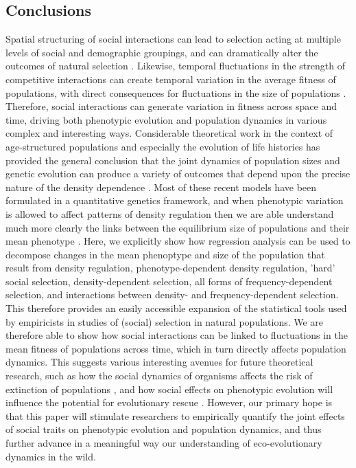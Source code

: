 \documentclass{article}
\begin{document}
\subsection{Conclusions}
Spatial structuring of social interactions can lead to selection acting at multiple levels of social and demographic groupings, and can dramatically alter the outcomes of natural selection \citep{Okasha2004, frank1998foundations, Wolf1999SocialSelection}. Likewise, temporal fluctuations in the strength of competitive interactions can create temporal variation in the average fitness of populations, with direct consequences for fluctuations in the size of populations \citep{Gilpin1973a}. Therefore, social interactions can generate variation in fitness across space and time, driving both phenotypic evolution and population dynamics in various complex and interesting ways. Considerable theoretical work in the context of age-structured populations and especially the evolution of life histories has provided the general conclusion that the joint dynamics of population sizes and genetic evolution can produce a variety of outcomes that depend upon the precise nature of the density dependence \citep{Engen2013, Engen2020, Lande2009a, Lande2017}. Most of these recent models have been formulated in a quantitative genetics framework, and when phenotypic variation is allowed to affect patterns of density regulation then we are able understand much more clearly the links between the equilibrium size of populations and their mean phenotype \citep{Engen2020}. Here, we explicitly show how regression analysis can be used to decompose changes in the mean phenoptype and size of the population that result from density regulation, phenotype-dependent density regulation, 'hard' social selection, density-dependent selection, all forms of frequency-dependent selection, and interactions between density- and frequency-dependent selection. This therefore provides an easily accessible expansion of the statistical tools used by empiricists in studies of (social) selection in natural populations. We are therefore able to show how social interactions can be linked to fluctuations in the mean fitness of populations across time, which in turn directly affects population dynamics. This suggests various interesting avenues for future theoretical research, such as how the social dynamics of organisms affects the risk of extinction of populations \citep{Angulo2018}, and how social effects on phenotypic evolution will influence the potential for evolutionary rescue \citep{Chevin2010}. However, our primary hope is that this paper will stimulate researchers to empirically quantify the joint effects of social traits on phenotypic evolution and population dynamics, and thus further advance in a meaningful way our understanding of eco-evolutionary dynamics in the wild.
\end{document}
